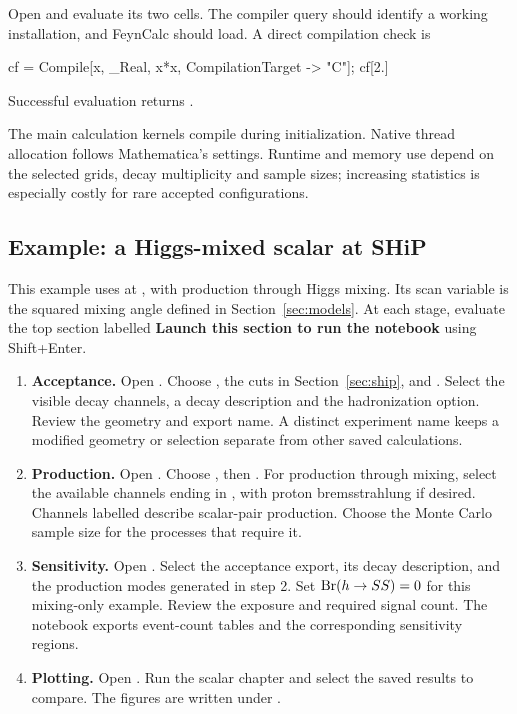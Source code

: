 Open  and evaluate its two cells. The compiler query should identify a working installation, and FeynCalc should load. A direct compilation check is
\begin{Code}
cf = Compile[{{x, _Real}}, x*x, CompilationTarget -> "C"];
cf[2.]
\end{Code}
Successful evaluation returns .

The main calculation kernels compile during initialization. Native thread allocation follows Mathematica's settings. Runtime and memory use depend on the selected grids, decay multiplicity and sample sizes; increasing statistics is especially costly for rare accepted configurations.

\subsection{Example: a Higgs-mixed scalar at SHiP}
This example uses  at , with production through Higgs mixing. Its scan variable is the squared mixing angle defined in Section~\ref{sec:models}. At each stage, evaluate the top section labelled \textbf{Launch this section to run the notebook} using Shift+Enter.

\begin{enumerate}[itemsep=5pt]
\item \textbf{Acceptance.} Open . Choose , the cuts in Section~\ref{sec:ship}, and . Select the visible decay channels, a decay description and the hadronization option. Review the geometry and export name. A distinct experiment name keeps a modified geometry or selection separate from other saved calculations.
\item \textbf{Production.} Open . Choose , then . For production through mixing, select the available channels ending in , with proton bremsstrahlung if desired. Channels labelled  describe scalar-pair production. Choose the Monte Carlo sample size for the processes that require it.
\item \textbf{Sensitivity.} Open . Select the acceptance export, its decay description, and the production modes generated in step 2. Set $\operatorname{Br}(h\to SS)=0$ for this mixing-only example. Review the exposure and required signal count. The notebook exports event-count tables and the corresponding sensitivity regions.
\item \textbf{Plotting.} Open . Run the scalar chapter and select the saved results to compare. The figures are written under .
\end{enumerate}


